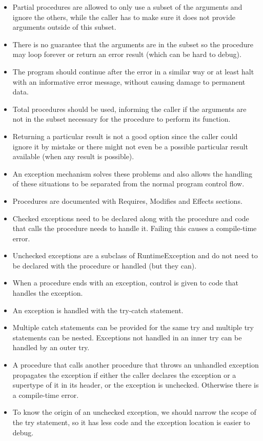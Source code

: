 \documentclass[a4paper,11pt]{article}
\theoremstyle{plain}
\theoremstyle{nonumberplain}
\begin{document}
\begin{itemize}
  \item Partial procedures are allowed to only use a subset of the arguments and ignore the others, while the caller has to make sure it does not provide arguments outside of this subset.
  \item There is no guarantee that the arguments are in the subset so the procedure may loop forever or return an error result (which can be hard to debug).
  \item The program should continue after the error in a similar way or at least halt with an informative error message, without causing damage to permanent data.
  \item Total procedures should be used, informing the caller if the arguments are not in the subset necessary for the procedure to perform its function.
  \item Returning a particular result is not a good option since the caller could ignore it by mistake or there might not even be a possible particular result available (when any result is possible).
  \item An exception mechanism solves these problems and also allows the handling of these situations to be separated from the normal program control flow.
  \item Procedures are documented with Requires, Modifies and Effects sections.
  \item Checked exceptions need to be declared along with the procedure and code that calls the procedure needs to handle it. Failing this causes a compile-time error.
  \item Unchecked exceptions are a subclass of RuntimeException and do not need to be declared with the procedure or handled (but they can).
  \item When a procedure ends with an exception, control is given to code that handles the exception.
  \item An exception is handled with the try-catch statement.
  \item Multiple catch statements can be provided for the same try and multiple try statements can be nested. Exceptions not handled in an inner try can be handled by an outer try.
  \item A procedure that calls another procedure that throws an unhandled exception propagates the exception if either the caller declares the exception or a supertype of it in its header, or the exception is unchecked. Otherwise there is a compile-time error.
  \item To know the origin of an unchecked exception, we should narrow the scope of the try statement, so it has less code and the exception location is easier to debug.

\end{itemize}
\end{document}
